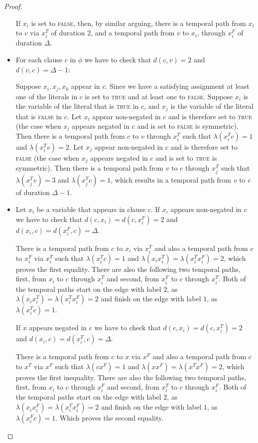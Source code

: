 \documentclass[a4paper,UKenglish,cleveref, autoref, thm-restate]{lipics-v2021}
\begin{document}
\begin{proof}
\begin{itemize}
    If $x_i$ is set to \textsc{false}, then, by similar arguing, 
    there is a temporal path from $x_i$ to $v$ via $x_i^T$ of duration $2$,
    and a temporal path from $v$ to $x_i$, through $x_i^F$ of duration $\Delta$.

    \item For each clause $c$ in $\phi$ we have to check that $d(c,v)=2$
    and $d(v,c)=\Delta - 1$:

    Suppose $x_i,x_j,x_k$ appear in $c$.
    Since we have a satisfying assignment at least one of the literals in $c$ is set to \textsc{true} and at least one to \textsc{false}. 
    Suppose $x_i$ is the variable of the literal that is \textsc{true} in $c$,
    and $x_j$ is the variable of the literal that is \textsc{false} in $c$.
    Let $x_i$ appear non-negated in $c$ and is therefore set to \textsc{true} (the case when $x_i$ appears negated in $c$ and is set to \textsc{false} is symmetric).
    Then there is a temporal path from $c$ to $v$ through $x_i^T$ such that $\lambda(x_i^T c)=1$ and $\lambda(x_i^T v)=2$. 
    Let $x_j$ appear non-negated in $c$ and is therefore set to \textsc{false} 
    (the case when $x_j$ appears negated in $c$ and is set to \textsc{true} is symmetric).
    Then there is a temporal path from $v$ to $c$ through $x_j^T$ such that $\lambda(x_j^T v)=3$ and $\lambda(x_j^T c)=1$,
    which results in a temporal path from $v$ to $c$ of duration $\Delta -1$.
    
    \item Let $x_i$ be a variable that appears in clause $c$.
    If $x_i$ appears non-negated in $c$ we have to check that $d(c,x_i)=d(c,x_i^F)=2$
    and $d(x_i,c)=d(x_i^F,c)= \Delta$.

    There is a temporal path from $c$ to $x_i$ via $x_i^T$ and also a temporal path from $c$ to $x_i^F$ via $x_i^T$ such that $\lambda(x_i^T c)=1$ and $\lambda(x_i x_i^T)=\lambda(x_i^T x_i^F)=2$,
    which proves the first equality.
    There are also the following two temporal paths,
    first, from $x_i$ to $c$ through $x_i^T$ and
    second, from $x_i^F$ to $c$ through $x_i^T$.
    Both of the temporal paths start on the edge with label $2$, as 
    $\lambda(x_i x_i^T) = \lambda (x_i^T x_i^F)=2$ and 
    finish on the edge with label $1$, as $\lambda(x_i^T c) = 1$.

    If $x$ appears negated in $c$ we have to check that 
    $d(c,x_i)=d(c,x_i^T)=2$
    and $d(x_i,c)=d(x_i^T,c)= \Delta$.

    There is a temporal path from $c$ to $x$ via $x^F$ and also a temporal path from $c$ to $x^T$ via $x^F$ such that $\lambda(c x^F)=1$ and $\lambda(x x^F)=\lambda(x^T x^F)=2$,
    which proves the first inequality.
    There are also the following two temporal paths,
    first, from $x_i$ to $c$ through $x_i^F$ and
    second, from $x_i^T$ to $c$ through $x_i^F$.
    Both of the temporal paths start on the edge with label $2$, as 
    $\lambda(x_i x_i^F) = \lambda (x_i^T x_i^F)=2$ and 
    finish on the edge with label $1$, as $\lambda(x_i^F c) = 1$.
    Which proves the second equality.
    

\end{itemize}
\end{proof}
\end{document}
